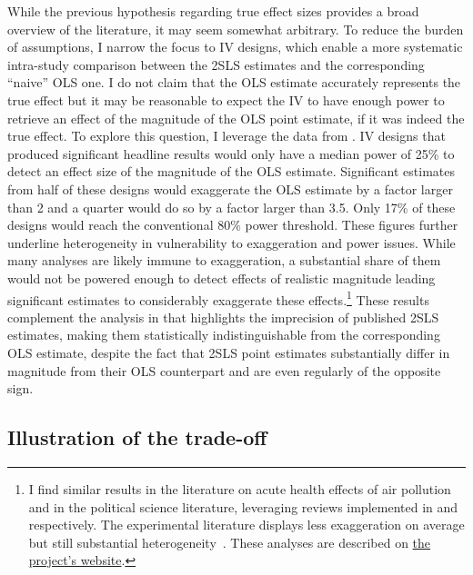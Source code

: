 \documentclass[usletter, 12pt]{article}
\begin{document}
			While the previous hypothesis regarding true effect sizes provides a broad overview of the literature, it may seem somewhat arbitrary. To reduce the burden of assumptions, I narrow the focus to IV designs, which enable a more systematic intra-study comparison between the 2SLS estimates and the corresponding ``naive'' OLS one. I do not claim that the OLS estimate accurately represents the true effect but it may be reasonable to expect the IV to have enough power to retrieve an effect of the magnitude of the OLS point estimate, if it was indeed the true effect. To explore this question, I leverage the data from \cite{young_consistency_2022}. IV designs that produced significant headline results would only have a median power of 25\% to detect an effect size of the magnitude of the OLS estimate. Significant estimates from half of these designs would exaggerate the OLS estimate by a factor larger than 2 and a quarter would do so by a factor larger than 3.5. Only 17\% of these designs would reach the conventional 80\% power threshold. These figures further underline heterogeneity in vulnerability to exaggeration and power issues. While many analyses are likely immune to exaggeration, a substantial share of them would not be powered enough to detect effects of realistic magnitude leading significant estimates to considerably exaggerate these effects.\footnote{I find similar results in the literature on acute health effects of air pollution and in the political science literature, leveraging reviews implemented in \cite{bagilet_accurate_2023} and \cite{lalHow2024} respectively. The experimental literature displays less exaggeration on average but still substantial heterogeneity \cite{camerer_evaluating_2016}. These analyses are described on \href{https://vincentbagilet.github.io/causal_exaggeration/lit_IVs.html}{the project's website}.} These results complement the analysis in \cite{young_consistency_2022} that highlights the imprecision of published 2SLS estimates, making them statistically indistinguishable from the corresponding OLS estimate, despite the fact that 2SLS point estimates substantially differ in magnitude from their OLS counterpart and are even regularly  of the opposite sign. %
			
	\subsection{Illustration of the trade-off}
	
\end{document}
